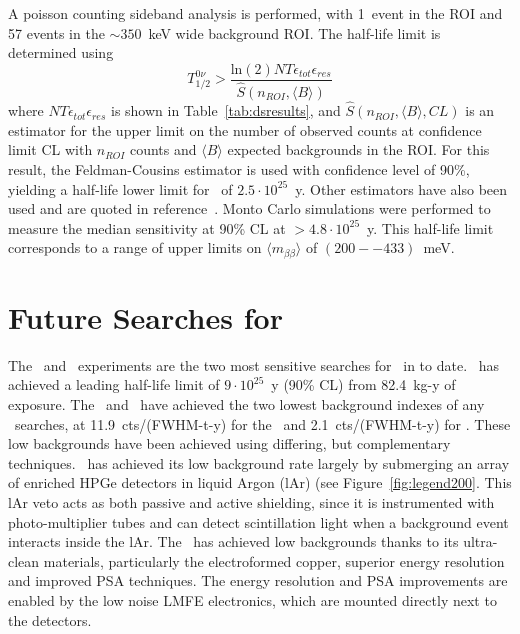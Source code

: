 \documentclass[/main.tex]{subfiles}
\begin{document}
A poisson counting sideband analysis is performed, with 1~event in the ROI and 57 events in the $\sim350$~keV wide background ROI.
The half-life limit is determined using
\begin{equation}
  T_{1/2}^{0\nu}>\frac{\mathrm{ln}(2)NT\epsilon_{tot}\epsilon_{res}}{\hat{S}(n_{ROI}, \langle B\rangle)}
\end{equation}
where $NT\epsilon_{tot}\epsilon_{res}$ is shown in Table~\ref{tab:dsresults}, and $\hat{S}(n_{ROI}, \langle B\rangle, CL)$ is an estimator for the upper limit on the number of observed counts at confidence limit CL with $n_{ROI}$ counts and $\langle B\rangle$ expected backgrounds in the ROI.
For this result, the Feldman-Cousins estimator\cite{feldmancousins} is used with confidence level of 90\%, yielding a half-life lower limit for  \znbb\ of $2.5\cdot10^{25}$~y.
Other estimators have also been used and are quoted in reference~\cite{mjd2019}.
Monto Carlo simulations were performed to measure the median sensitivity at 90\% CL at $>4.8\cdot10^{25}$~y.
This half-life limit corresponds to a range of upper limits on $\langle m_{\beta\beta}\rangle$ of $(200--433)$~meV.

\section{Future Searches for  \znbb} \label{sec:legend}
The \MJD\ and \Gerda\ experiments are the two most sensitive searches for \znbb\ in  to date.
\Gerda\ has achieved a leading half-life limit of $9\cdot10^{25}$~y (90\% CL) from 82.4~kg-y of exposure\cite{gerda}.
The \MJD\ and \Gerda\ have achieved the two lowest background indexes of any \znbb\ searches, at 11.9~cts/(FWHM-t-y) for the \MJD\ and 2.1~cts/(FWHM-t-y) for \Gerda.
These low backgrounds have been achieved using differing, but complementary techniques.
\Gerda\ has achieved its low background rate largely by submerging an array of enriched HPGe detectors in liquid Argon (lAr) (see Figure~\ref{fig:legend200}.
This lAr veto acts as both passive and active shielding, since it is instrumented with photo-multiplier tubes and can detect scintillation light when a background event interacts inside the lAr.
The \MJD\ has achieved low backgrounds thanks to its ultra-clean materials, particularly the electroformed copper, superior energy resolution and improved PSA techniques.
The energy resolution and PSA improvements are enabled by the low noise LMFE electronics, which are mounted directly next to the detectors.
\end{document}
